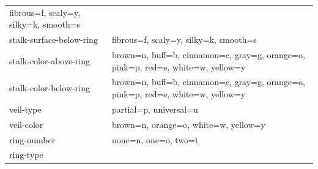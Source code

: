 \documentclass[
]{article}
\begin{document}
\begin{longtable}[]{@{}ll@{}}
\begin{minipage}[t]{0.47\columnwidth}
fibrous=f, scaly=y, silky=k, smooth=s\strut
\end{minipage}\tabularnewline
\begin{minipage}[t]{0.47\columnwidth}\raggedright
stalk-surface-below-ring\strut
\end{minipage} & \begin{minipage}[t]{0.47\columnwidth}\raggedright
fibrous=f, scaly=y, silky=k, smooth=s\strut
\end{minipage}\tabularnewline
\begin{minipage}[t]{0.47\columnwidth}\raggedright
stalk-color-above-ring\strut
\end{minipage} & \begin{minipage}[t]{0.47\columnwidth}\raggedright
brown=n, buff=b, cinnamon=c, gray=g, orange=o, pink=p, red=e, white=w,
yellow=y\strut
\end{minipage}\tabularnewline
\begin{minipage}[t]{0.47\columnwidth}\raggedright
stalk-color-below-ring\strut
\end{minipage} & \begin{minipage}[t]{0.47\columnwidth}\raggedright
brown=n, buff=b, cinnamon=c, gray=g, orange=o, pink=p, red=e, white=w,
yellow=y\strut
\end{minipage}\tabularnewline
\begin{minipage}[t]{0.47\columnwidth}\raggedright
veil-type\strut
\end{minipage} & \begin{minipage}[t]{0.47\columnwidth}\raggedright
partial=p, universal=u\strut
\end{minipage}\tabularnewline
\begin{minipage}[t]{0.47\columnwidth}\raggedright
veil-color\strut
\end{minipage} & \begin{minipage}[t]{0.47\columnwidth}\raggedright
brown=n, orange=o, white=w, yellow=y\strut
\end{minipage}\tabularnewline
\begin{minipage}[t]{0.47\columnwidth}\raggedright
ring-number\strut
\end{minipage} & \begin{minipage}[t]{0.47\columnwidth}\raggedright
none=n, one=o, two=t\strut
\end{minipage}\tabularnewline
\begin{minipage}[t]{0.47\columnwidth}\raggedright
ring-type\strut
\end{minipage} & \begin{minipage}[t]{0.47\columnwidth}\raggedright

\end{minipage}
\end{longtable}
\end{document}

